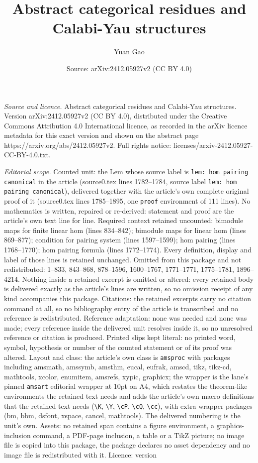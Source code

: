\documentclass[10pt,a4paper]{amsart}
\title[Abstract categorical residues and Calabi-Yau structures]{Abstract categorical residues and Calabi-Yau structures}
\author{Yuan Gao}
\date{Source: arXiv:2412.05927v2 (CC BY 4.0)}
\begin{document}
\maketitle

\noindent\emph{Source and licence.} Abstract categorical residues and Calabi-Yau structures. Version arXiv:2412.05927v2 (CC BY 4.0), distributed under the Creative Commons Attribution 4.0 International licence, as recorded in the arXiv licence metadata for this exact version and shown on the abstract page https://arxiv.org/abs/2412.05927v2. Full rights notice: licenses/arxiv-2412.05927-CC-BY-4.0.txt.\par\smallskip

\noindent\textit{Editorial scope.} Counted unit: the Lem whose source label is \texttt{lem: hom pairing canonical} in the article (source0.tex lines 1782--1784, source label \texttt{lem: hom pairing canonical}), delivered together with the article's own complete original proof of it (source0.tex lines 1785--1895, one \texttt{proof} environment of 111 lines). No mathematics is written, repaired or re-derived: statement and proof are the article's own text line for line. Required context retained uncounted: bimodule maps for finite linear hom (lines 834--842); bimodule maps for linear hom (lines 869--877); condition for pairing system (lines 1597--1599); hom pairing (lines 1768--1770); hom pairing formula (lines 1772--1774). Every definition, display and label of those lines is retained unchanged. Omitted from this package and not redistributed: 1--833, 843--868, 878--1596, 1600--1767, 1771--1771, 1775--1781, 1896--4214. Nothing inside a retained excerpt is omitted or altered: every retained body is delivered exactly as the article's lines are written, so no omission receipt of any kind accompanies this package. Citations: the retained excerpts carry no citation command at all, so no bibliography entry of the article is transcribed and no reference is redistributed. Reference adaptation: none was needed and none was made; every reference inside the delivered unit resolves inside it, so no unresolved reference or citation is produced. Printed slips kept literal: no printed word, symbol, hypothesis or number of the counted statement or of its proof was altered. Layout and class: the article's own class is \texttt{amsproc} with packages including amsmath, amssymb, amsthm, eucal, eufrak, amscd, tikz, tikz-cd, mathtools, xcolor, enumitem, amsrefs, xypic, graphicx; the wrapper is the lane's pinned \texttt{amsart} editorial wrapper at 10pt on A4, which restates the theorem-like environments the retained text needs and adds the article's own macro definitions that the retained text needs (\texttt{\textbackslash K}, \texttt{\textbackslash Y}, \texttt{\textbackslash cP}, \texttt{\textbackslash cQ}, \texttt{\textbackslash cc}), with extra wrapper packages (bm, bbm, dsfont, xspace, cancel, mathtools). The delivered numbering is the unit's own. Assets: no retained span contains a figure environment, a graphics-inclusion command, a PDF-page inclusion, a table or a TikZ picture; no image file is copied into this package, the package declares no asset dependency and no image file is redistributed with it. Licence: version 
\end{document}
